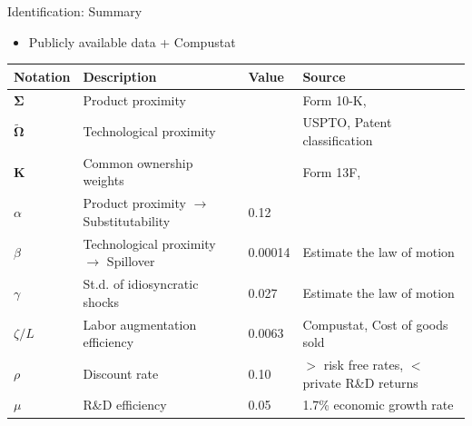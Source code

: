 \documentclass[
  10pt, %
  aspectratio=169,  %
  handout
]{beamer}
\theoremstyle{plain}
\begin{document}
%
\begin{frame}{Identification: Summary}
  \begin{itemize}
    \item Publicly available data + Compustat
  \end{itemize}
  \begin{table}[h]
    \centering
      \small %
      \begin{tabular}{llll}
        \toprule
        Notation                           & Description                                      & Value   & Source                                   \\
        \midrule
        $\boldsymbol{\Sigma}$                   & Product proximity                                &         & Form 10-K, \citet{Hoberg2016-jm}          \\
        $\boldsymbol{\widetilde{\Omega}}$       & Technological proximity                          &         & USPTO, Patent classification             \\
        $\boldsymbol{K}$                        & Common ownership weights                         &         & Form 13F, \citet{Backus2021-yt}          \\
        $\alpha$                           & Product proximity $\rightarrow$ Substitutability & 0.12    & \citet{Pellegrino2024-dn}                \\
        $\beta$                            & Technological proximity $\rightarrow$ Spillover  & 0.00014 & Estimate the law of motion               \\
        $\gamma$                           & St.d. of idiosyncratic shocks                    & 0.027   & Estimate the law of motion               \\
        $\zeta/L$                          & Labor augmentation efficiency                    & 0.0063  & Compustat, Cost of goods sold            \\
        $\rho$                             & Discount rate                                    & 0.10    & $>$ risk free rates, $<$ private R\&D returns \\
        $\mu$                              & R\&D efficiency                                  & 0.05    & 1.7\% economic growth rate               \\
        \bottomrule
      \end{tabular}
  \end{table}
\end{frame}
\end{document}
